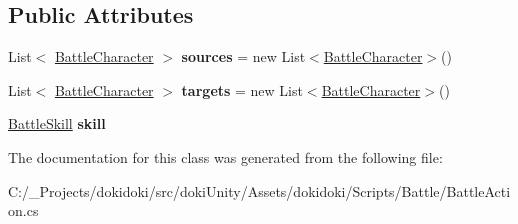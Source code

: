 \subsection*{Public Attributes}
\begin{DoxyCompactItemize}
\item 
List$<$ \hyperlink{class_battle_character}{Battle\+Character} $>$ {\bfseries sources} = new List$<$\hyperlink{class_battle_character}{Battle\+Character}$>$()\hypertarget{class_battle_action_afd48f4fbc468d52ff4e622313953044c}{}\label{class_battle_action_afd48f4fbc468d52ff4e622313953044c}

\item 
List$<$ \hyperlink{class_battle_character}{Battle\+Character} $>$ {\bfseries targets} = new List$<$\hyperlink{class_battle_character}{Battle\+Character}$>$()\hypertarget{class_battle_action_a0ecf278b065e8e6cb16d6a4fe4cc7d2b}{}\label{class_battle_action_a0ecf278b065e8e6cb16d6a4fe4cc7d2b}

\item 
\hyperlink{class_battle_skill}{Battle\+Skill} {\bfseries skill}\hypertarget{class_battle_action_a7ac9fd312bd0ae166b594238955dbe25}{}\label{class_battle_action_a7ac9fd312bd0ae166b594238955dbe25}

\end{DoxyCompactItemize}


The documentation for this class was generated from the following file\+:\begin{DoxyCompactItemize}
\item 
C\+:/\+\_\+\+Projects/dokidoki/src/doki\+Unity/\+Assets/dokidoki/\+Scripts/\+Battle/Battle\+Action.\+cs\end{DoxyCompactItemize}
